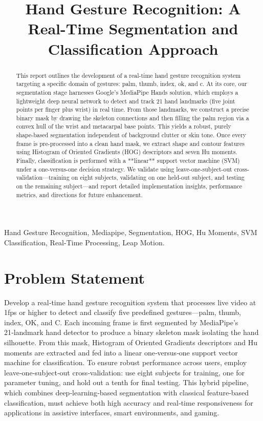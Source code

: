 \documentclass{article}
\title{Hand Gesture Recognition: A Real-Time Segmentation and Classification Approach}
\begin{document}

\maketitle

\begin{abstract}
This report outlines the development of a real-time hand gesture recognition system targeting a specific domain of gestures: palm, thumb, index, ok, and c. At its core, our segmentation stage harnesses Google’s MediaPipe Hands solution, which employs a lightweight deep neural network to detect and track 21 hand landmarks (five joint points per finger plus wrist) in real time. From those landmarks, we construct a precise binary mask by drawing the skeleton connections and then filling the palm region via a convex hull of the wrist and metacarpal base points. This yields a robust, purely shape-based segmentation independent of background clutter or skin tone. Once every frame is pre-processed into a clean hand mask, we extract shape and contour features using Histogram of Oriented Gradients (HOG) descriptors and seven Hu moments. Finally, classification is performed with a **linear** support vector machine (SVM) under a one-versus-one decision strategy. We validate using leave-one-subject-out cross-validation—training on eight subjects, validating on one held-out subject, and testing on the remaining subject—and report detailed implementation insights, performance metrics, and directions for future enhancement.
\end{abstract}

\begin{keywords}
Hand Gesture Recognition, Mediapipe, Segmentation, HOG, Hu Moments, SVM Classification, Real-Time Processing, Leap Motion.
\end{keywords}

\section{Problem Statement}
Develop a real‑time hand gesture recognition system that processes live video at 1fps or higher to detect and classify five predefined gestures—palm, thumb, index, OK, and C. Each incoming frame is first segmented by MediaPipe’s 21‑landmark hand detector to produce a binary skeleton mask isolating the hand silhouette. From this mask, Histogram of Oriented Gradients descriptors and Hu moments are extracted and fed into a linear one‑versus‑one support vector machine for classification. To ensure robust performance across users, employ leave‑one‑subject‑out cross‑validation: use eight subjects for training, one for parameter tuning, and hold out a tenth for final testing. This hybrid pipeline, which combines deep‑learning‑based segmentation with classical feature‑based classification, must achieve both high accuracy and real‑time responsiveness for applications in assistive interfaces, smart environments, and gaming.
\end{document}
